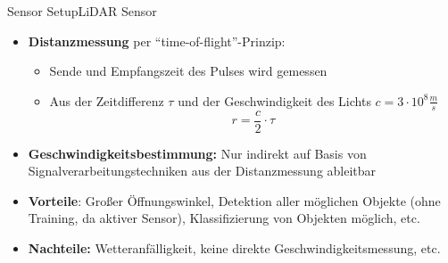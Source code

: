 \documentclass[169, handout	]{THIbeamer} %
\begin{document}
	\begin{frame}{Sensor Setup}{LiDAR Sensor}
		\begin{itemize}
			\item \textbf{Distanzmessung} per \enquote{time-of-flight}-Prinzip:
			\begin{itemize}
				\item Sende und Empfangszeit des Pulses wird gemessen
				\item Aus der Zeitdifferenz $\tau$ und der Geschwindigkeit des Lichts $ c = 3 \cdot 10^{8} \frac{m}{s} $
				\begin{equation}
					r = \frac{c}{2} \cdot \tau
				\end{equation}
			\end{itemize}
			\item \textbf{Geschwindigkeitsbestimmung:} Nur indirekt auf Basis von Signalverarbeitungstechniken aus der Distanzmessung ableitbar
			\item \textbf{Vorteile}: Großer Öffnungswinkel, Detektion aller möglichen Objekte (ohne Training, da aktiver Sensor), Klassifizierung von Objekten möglich, etc.
			\item \textbf{Nachteile:} Wetteranfälligkeit, keine direkte Geschwindigkeitsmessung, etc.
		\end{itemize}
	\end{frame}
\end{document}
